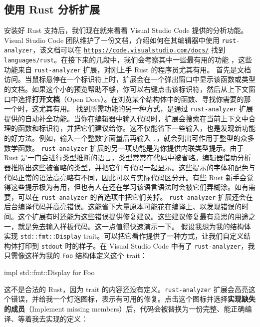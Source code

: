 \subsection{使用 Rust 分析扩展}
\label{idx:idx_d2a10f06}
\label{idx:idx_37057724}
安装好 Rust 支持后，我们现在就来看看 Visual Studio Code 提供的分析功能。Visual Studio Code 团队维护了一份文档，介绍如何在其编辑器中使用 \texttt{rust-}
\texttt{analyzer}，该文档可以在 \href{https://code.visualstudio.com/docs/}{\texttt{https:/\allowbreak{}/\allowbreak{}code.\allowbreak{}visualstudio.\allowbreak{}com/\allowbreak{}docs/\allowbreak{}}} 找到
\texttt{languages/\allowbreak{}rust}。在接下来的几段中，我们会考察其中一些最有用的功能
，这些功能来自 \texttt{rust-\allowbreak{}analyzer} 扩展，对刚上手 Rust 的程序员尤其有用。
首先是文档访问。当鼠标悬停在一个标识符上时，扩展会在一个弹出窗口中显示该函数或类型的文档。如果这个小的预览帮助不够，你可以右键点击该标识符，然后从上下文窗口中选择\textbf{打开文档}（Open Docs）。在浏览某个结构体中的函数、寻找你需要的那一个时，这尤其有用。
找到所需功能的另一种方式，是通过 \texttt{rust-\allowbreak{}analyzer} 扩展提供的自动补全功能。当你在编辑器中输入代码时，扩展会搜索在当前上下文中合理的函数和标识符，并把它们建议给你。这不仅能省下一些输入，也是发现新功能的好方法。例如，输入一个整数字面量后再输入 \texttt{.}，就会列出可作用于整型的众多数学函数。
\texttt{rust-\allowbreak{}analyzer} 扩展的另一项功能是为你提供内联类型提示。由于 Rust 是一门会进行类型推断的语言，类型常常在代码中被省略。编辑器借助分析器推断出这些被省略的类型，并把它们与代码一起显示。这些提示的字体和配色与代码正常的语法高亮略有不同，因此可以与实际代码区分开。有些 Rust 新手会觉得这些提示极为有用，但也有人在还在学习该语言语法时会被它们弄糊涂。如有需要，可以在 \texttt{rust-\allowbreak{}analyzer} 的首选项中把它们关掉。
\texttt{rust-\allowbreak{}analyzer} 扩展还会在后台编译代码并高亮错误。这能省下大量原本可能花在编译上、以发现错误的时间。这个扩展有时还能为这些错误提供修复建议。这些建议修复最有意思的用途之一，就是免去输入样板代码。这一点值得快速演示一下。
\label{idx:idx_e14c9e9f}
\label{idx:idx_3abe41cf}
假设我想为我的结构体实现 \texttt{std::\allowbreak{}fmt::\allowbreak{}Display} trait。可以把它看作提供了一种方式，让我们自定义结构体打印到 \texttt{stdout} 时的样子。在 Visual Studio Code 中有了 \texttt{rust-\allowbreak{}analyzer}，我只需像这样为我的 \texttt{Foo} 结构体定义这个 trait：
\begin{codebox}[rust]
impl std::fmt::Display for Foo {}
\end{codebox}
这不是合法的 Rust，因为 trait 的内容还没有定义。\texttt{rust-\allowbreak{}analyzer} 扩展会高亮这个错误，并给我一个灯泡图标，表示有可用的修复。点击这个图标并选择\textbf{实现缺失的成员}（Implement missing members）后，代码会被替换为一份完整、能正确编译、等着我去实现的定义：
